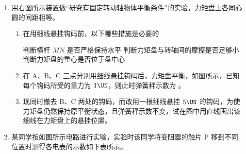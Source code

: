 \documentclass[\gkver]{gaokaozhenti}
\begin{document}
\begin{enumerate}
{评分标准：全题 30 分，具体见于各题答案后。
}

\item
用右图所示装置做“研究有固定转动轴物体平衡条件”的实验，力矩盘上各同心圆的间距相等。

\begin{enumerate}
\item
在用细线悬挂钩码前，以下哪些措施是必要的

{判断横杆 $MN$ 是否严格保持水平}
{判断力矩盘与转轴间的摩擦是否足够小}
{判断力矩盘的重心是否位于盘中心}
\item
在 A、B、C 三点分别用细线悬挂钩码后，力矩盘平衡，如图所示，已知每个钩码所受的重力为 $1\UN$，则此时弹簧秤示数为 \tkanswer[2cm]{$4\UN$}。
\item
现同时撤去 B、C 两处的钩码，而改用一根细线悬挂 $5\UN$ 的钩码，为使力矩盘仍然保持原平衡状态，且弹簧秤示数不变，试在图中用直线画出该细线在力矩盘上的悬挂位置。
\end{enumerate}

\onepicture[align=right, h=5.27cm]{}



\item
某同学按如图所示电路进行实验，实验时该同学将变阻器的触片 P 移到不同位置时测得各电表的示数如下表所示。


\end{enumerate}
\end{document}
